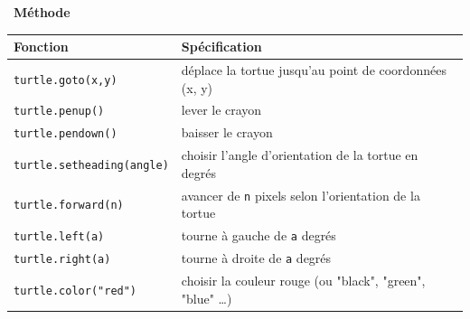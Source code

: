 \documentclass[a4paper, french, 12pt]{article}  %
\newenvironment{methode}[1]
{\par \medskip    \noindent  
 \begin {bclogo}[arrondi =0.1,logo=\bcoutil, marge=4,noborder = true] {~\textbf{Méthode}   {\itshape #1} }  \par}
{
\end{bclogo}
 \par \bigskip }
\begin{document}
\begin{methode}{}
\begin{itemize}
\begin{center}
	\begin{tabular}{|l|l|}
	\hline 
	Fonction & Spécification \\ 
	\hline 
	\texttt{turtle.goto(x,y)} & déplace la tortue jusqu'au point de coordonnées (x, y) \\
	\hline
	\texttt{turtle.penup()} & lever le crayon \\
	\hline
	\texttt{turtle.pendown()} & baisser le crayon \\
	\hline
	\texttt{turtle.setheading(angle)} & choisir l'angle d'orientation  de la tortue en degrés \\
	\hline 
	\texttt{turtle.forward(n)} & avancer de \texttt{n} pixels selon l'orientation de la tortue   \\
	\hline
	\texttt{turtle.left(a)} & tourne à gauche de \texttt{a} degrés   \\
	\hline
	\texttt{turtle.right(a)} & tourne à droite de \texttt{a}  degrés   \\
	\hline 
	\texttt{turtle.color("red")} & choisir la couleur rouge (ou "black", "green", "blue" \ldots)  \\
	\hline 
	\end{tabular} 
\end{center}

\end{itemize}

\end{methode}
\end{document}
